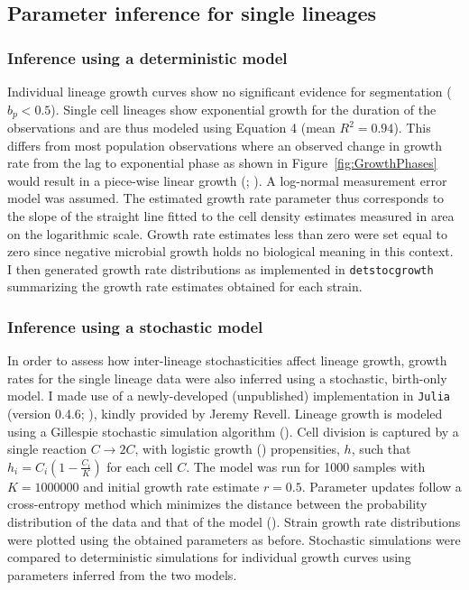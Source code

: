 \documentclass{bioinfo}
\begin{document}
\vspace{-1em}
\subsection{Parameter inference for single lineages}
\subsubsection{Inference using a deterministic model}
Individual lineage growth curves show no significant evidence for segmentation ($b_p<0.5$). Single cell lineages show exponential growth for the duration of the observations and are thus modeled using Equation 4 (mean $R^2=0.94$). This differs from most population observations where an observed change in growth rate from the lag to exponential phase as shown in Figure~\ref{fig:GrowthPhases} would result in a piece-wise linear growth (\citealp{Buchanan97}; \citealp{Baranyi02}). A log-normal measurement error model was assumed.
The estimated growth rate parameter thus corresponds to the slope of the straight line fitted to the cell density estimates measured in area on the logarithmic scale. Growth rate estimates less than zero were set equal to zero since negative microbial growth holds no biological meaning in this context. I then generated growth rate distributions as implemented in \texttt{detstocgrowth} summarizing the growth rate estimates obtained for each strain.
\vspace{-1em}
\subsubsection{Inference using a stochastic model}
In order to assess how inter-lineage stochasticities affect lineage growth, growth rates for the single lineage data were also inferred using a stochastic, birth-only model. I made use of a newly-developed (unpublished) implementation in \texttt{Julia} (version 0.4.6; \citealp{Bezanson12}), kindly provided by Jeremy Revell. Lineage growth is modeled using a Gillespie stochastic simulation algorithm (\citealp{Gillespie77}). Cell division is captured by a single reaction $C\rightarrow 2C$, with logistic growth (\citealp{Verhulst45}) propensities, $h$, such that $h_i=C_i(1-\frac{C_i}{K})$ for each cell $C$. The model was run for 1000 samples with $K=1000000$ and initial growth rate estimate $r=0.5$. Parameter updates follow a cross-entropy method which minimizes the distance between the probability distribution of the data and that of the model (\citealp{Rubenstein04}). Strain growth rate distributions were plotted using the obtained parameters as before. Stochastic simulations were compared to deterministic simulations for individual growth curves using parameters inferred from the two models. 
\end{document}
